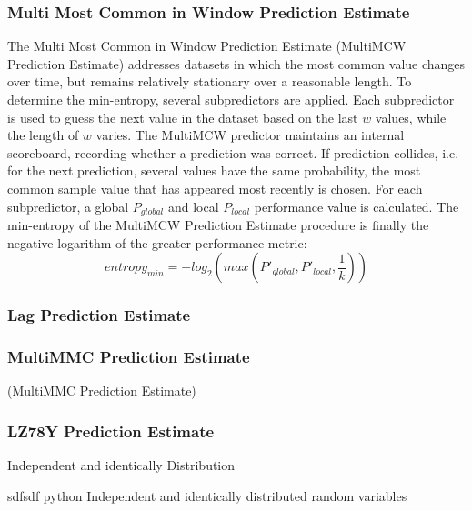 \subsubsection{Multi Most Common in Window Prediction Estimate}\label{non-iid-est:mmcwpe}
The Multi Most Common in Window Prediction Estimate (MultiMCW Prediction Estimate) addresses datasets in which the most common value changes over time, but remains relatively stationary over a reasonable length. To determine the min-entropy, several subpredictors are applied. Each subpredictor is used to guess the next value in the dataset based on the last $w$ values, while the length of $w$ varies. The MultiMCW predictor maintains an internal scoreboard, recording whether a prediction was correct. If prediction collides, i.e. for the next prediction, several values have the same probability, the most common sample value that has appeared most recently is chosen. For each subpredictor, a global $P_{global}$ and local $P_{local}$ performance value is calculated.
The min-entropy of the MultiMCW Prediction Estimate procedure is finally the negative logarithm of the greater performance metric:
\begin{equation}
entropy_{min} = -log_2\left(max\left(P'_{global}, P'_{local}, \frac{1}{k}\right)\right)
\end{equation}

\subsubsection{Lag Prediction Estimate}\label{non-iid-est:lpe}
\subsubsection{MultiMMC Prediction Estimate}\label{non-iid-est:mmcpe}
(MultiMMC Prediction Estimate)
\subsubsection{LZ78Y Prediction Estimate}\label{non-iid-est:lz78y}





Independent and identically Distribution

 sdfsdf
 \gls{python}
Independent and identically distributed random variables


